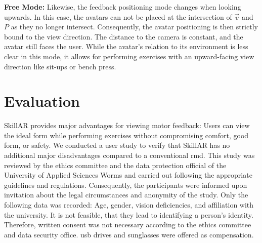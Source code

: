 \textbf{Free Mode:}
Likewise, the feedback positioning mode changes when looking upwards. In this case, the avatars can not be placed at the intersection of $\vec{v}$ and $P$ as they no longer intersect. Consequently, the avatar positioning is then strictly bound to the view direction. The distance to the camera is constant, and the avatar still faces the user. While the avatar's relation to its environment is less clear in this mode, it allows for performing exercises with an upward-facing view direction like sit-ups or bench press.

\section{Evaluation}
SkillAR provides major advantages for viewing motor feedback: Users can view the ideal form while performing exercises without compromising comfort, good form, or safety. We conducted a user study to verify that SkillAR has no additional major disadvantages compared to a conventional \acrshort{rmd}. This study was reviewed by the ethics committee and the data protection official of the University of Applied Sciences Worms and carried out following the appropriate guidelines and regulations. Consequently, the participants were informed upon invitation about the legal circumstances and anonymity of the study. Only the following data was recorded: Age, gender, vision deficiencies, and affiliation with the university. It is not feasible, that they lead to identifying a person's identity. Therefore, written consent was not necessary according to the ethics committee and data security office. \acrshort{usb} drives and sunglasses were offered as compensation.

